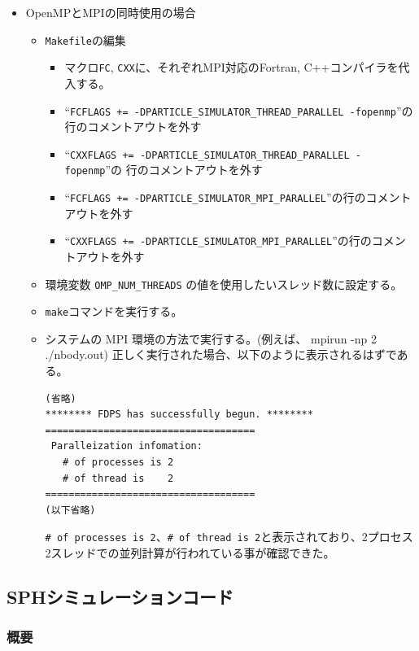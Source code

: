 \documentclass[12pt,a4paper,dvipdfmx]{jarticle}
\begin{document}
\begin{itemize}
\item OpenMPとMPIの同時使用の場合
  \begin{itemize}
  \item \texttt{Makefile}の編集
    \begin{itemize}
    \item マクロ\texttt{FC}, \texttt{CXX}に、それぞれMPI対応のFortran, C++コンパイラを代入する。
    \item ``\texttt{FCFLAGS += -DPARTICLE\_SIMULATOR\_THREAD\_PARALLEL -fopenmp}''の
      行のコメントアウトを外す
    \item ``\texttt{CXXFLAGS += -DPARTICLE\_SIMULATOR\_THREAD\_PARALLEL -fopenmp}''の
      行のコメントアウトを外す
    \item ``\texttt{FCFLAGS += -DPARTICLE\_SIMULATOR\_MPI\_PARALLEL}''の行のコメントアウトを外す
    \item ``\texttt{CXXFLAGS += -DPARTICLE\_SIMULATOR\_MPI\_PARALLEL}''の行のコメントアウトを外す
    \end{itemize}
  \item 環境変数 \texttt{OMP\_NUM\_THREADS} の値を使用したいスレッド数に設定する。
  \item \texttt{make}コマンドを実行する。
  \item システムの MPI 環境の方法で実行する。(例えば、 mpirun -np 2
    ./nbody.out) 正しく実行された場合、以下のように表示されるはずである。
\begin{screen}
\begin{verbatim}
(省略)
******** FDPS has successfully begun. ********
====================================
 Paralleization infomation:
   # of processes is 2
   # of thread is    2
====================================
(以下省略)
\end{verbatim}
\end{screen}
       \texttt{\# of processes is 2}、\texttt{\# of thread is    2}と表示されており、2プロセス2スレッドでの並列計算が行われている事が確認できた。
\end{itemize}
\end{itemize}

\subsection{SPHシミュレーションコード}

\subsubsection{概要}
\end{document}
